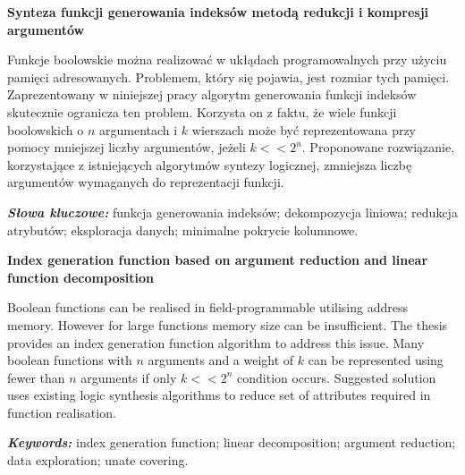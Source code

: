 \newpage
\vspace{10cm}

\newpage
\begin{center}
	\textbf{Synteza funkcji generowania indeksów metodą redukcji i kompresji argumentów}
\end{center}

Funkcje boolowskie można realizować w ukłądach programowalnych przy użyciu pamięci adresowanych.
Problemem, który się pojawia, jest rozmiar tych pamięci.
Zaprezentowany w niniejszej pracy algorytm generowania funkcji indeksów skutecznie ogranicza ten problem.
Korzysta on z faktu,
że wiele funkcji boolowskich o $n$ argumentach i $k$ wierszach może być reprezentowana przy pomocy mniejszej liczby argumentów,
jeżeli $k<<2^n$.
Proponowane rozwiązanie,
korzystające z istniejących algorytmów syntezy logicznej,
zmniejsza liczbę argumentów wymaganych do reprezentacji funkcji.

\textit{\textbf{Słowa kluczowe:}} funkcja generowania indeksów; dekompozycja liniowa; redukcja atrybutów; eksploracja danych; minimalne pokrycie kolumnowe.

	\vspace{1cm}

\begin{center}
    \textbf{Index generation function based on argument reduction and linear function decomposition}
\end{center}

Boolean functions can be realised in field-programmable utilising address memory.
However for large functions memory size can be insufficient.
The thesis provides an index generation function algorithm to address this issue.
Many boolean functions with $n$ arguments and a weight of $k$ can be represented using fewer than $n$ arguments if only $k<<2^n$ condition occurs.
Suggested solution uses existing logic synthesis algorithms to reduce set of attributes required in function realisation.

\textit{\textbf{Keywords:}} index generation function; linear decomposition; argument reduction; data exploration; unate covering.

